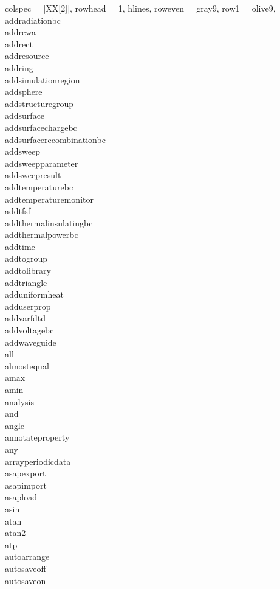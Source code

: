 \begin{longtblr}[
  caption = {Long Title},
  label = {tab:commands},
]{
  colspec = {|XX[2]|},
  rowhead = 1,
  hlines,
  row{even} = {gray9},
  row{1} = {olive9},
}
addradiationbc\\
addrcwa\\
addrect\\
addresource\\
addring\\
addsimulationregion\\
addsphere\\
addstructuregroup\\
addsurface\\
addsurfacechargebc\\
addsurfacerecombinationbc\\
addsweep\\
addsweepparameter\\
addsweepresult\\
addtemperaturebc\\
addtemperaturemonitor\\
addtfsf\\
addthermalinsulatingbc\\
addthermalpowerbc\\
addtime\\
addtogroup\\
addtolibrary\\
addtriangle\\
adduniformheat\\
adduserprop\\
addvarfdtd\\
addvoltagebc\\
addwaveguide\\
all\\
almostequal\\
amax\\
amin\\
analysis\\
and\\
angle\\
annotateproperty\\
any\\
arrayperiodicdata\\
asapexport\\
asapimport\\
asapload\\
asin\\
atan\\
atan2\\
atp\\
autoarrange\\
autosaveoff\\
autosaveon\\
\end{longtblr}


